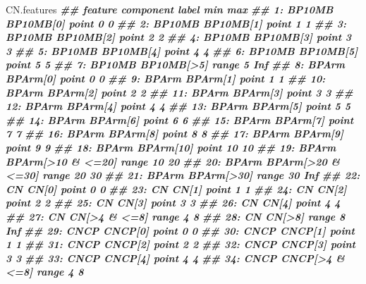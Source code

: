 \documentclass[
  12pt,
  a4paper,
  twoside]{book}
\newenvironment{Shaded}{\begin{snugshade}}{\end{snugshade}}
\newcommand{\DocumentationTok}[1]{\textcolor[rgb]{0.56,0.35,0.01}{\textbf{\textit{#1}}}}
\newcommand{\NormalTok}[1]{#1}
\begin{document}
\begin{Shaded}
\begin{Highlighting}[]
\NormalTok{CN.features}
\DocumentationTok{\#\#     feature         component label  min max}
\DocumentationTok{\#\#  1:  BP10MB         BP10MB[0] point    0   0}
\DocumentationTok{\#\#  2:  BP10MB         BP10MB[1] point    1   1}
\DocumentationTok{\#\#  3:  BP10MB         BP10MB[2] point    2   2}
\DocumentationTok{\#\#  4:  BP10MB         BP10MB[3] point    3   3}
\DocumentationTok{\#\#  5:  BP10MB         BP10MB[4] point    4   4}
\DocumentationTok{\#\#  6:  BP10MB         BP10MB[5] point    5   5}
\DocumentationTok{\#\#  7:  BP10MB        BP10MB[\textgreater{}5] range    5 Inf}
\DocumentationTok{\#\#  8:   BPArm          BPArm[0] point    0   0}
\DocumentationTok{\#\#  9:   BPArm          BPArm[1] point    1   1}
\DocumentationTok{\#\# 10:   BPArm          BPArm[2] point    2   2}
\DocumentationTok{\#\# 11:   BPArm          BPArm[3] point    3   3}
\DocumentationTok{\#\# 12:   BPArm          BPArm[4] point    4   4}
\DocumentationTok{\#\# 13:   BPArm          BPArm[5] point    5   5}
\DocumentationTok{\#\# 14:   BPArm          BPArm[6] point    6   6}
\DocumentationTok{\#\# 15:   BPArm          BPArm[7] point    7   7}
\DocumentationTok{\#\# 16:   BPArm          BPArm[8] point    8   8}
\DocumentationTok{\#\# 17:   BPArm          BPArm[9] point    9   9}
\DocumentationTok{\#\# 18:   BPArm         BPArm[10] point   10  10}
\DocumentationTok{\#\# 19:   BPArm BPArm[\textgreater{}10 \& \textless{}=20] range   10  20}
\DocumentationTok{\#\# 20:   BPArm BPArm[\textgreater{}20 \& \textless{}=30] range   20  30}
\DocumentationTok{\#\# 21:   BPArm        BPArm[\textgreater{}30] range   30 Inf}
\DocumentationTok{\#\# 22:      CN             CN[0] point    0   0}
\DocumentationTok{\#\# 23:      CN             CN[1] point    1   1}
\DocumentationTok{\#\# 24:      CN             CN[2] point    2   2}
\DocumentationTok{\#\# 25:      CN             CN[3] point    3   3}
\DocumentationTok{\#\# 26:      CN             CN[4] point    4   4}
\DocumentationTok{\#\# 27:      CN      CN[\textgreater{}4 \& \textless{}=8] range    4   8}
\DocumentationTok{\#\# 28:      CN            CN[\textgreater{}8] range    8 Inf}
\DocumentationTok{\#\# 29:    CNCP           CNCP[0] point    0   0}
\DocumentationTok{\#\# 30:    CNCP           CNCP[1] point    1   1}
\DocumentationTok{\#\# 31:    CNCP           CNCP[2] point    2   2}
\DocumentationTok{\#\# 32:    CNCP           CNCP[3] point    3   3}
\DocumentationTok{\#\# 33:    CNCP           CNCP[4] point    4   4}
\DocumentationTok{\#\# 34:    CNCP    CNCP[\textgreater{}4 \& \textless{}=8] range    4   8}

\end{Highlighting}
\end{Shaded}
\end{document}
